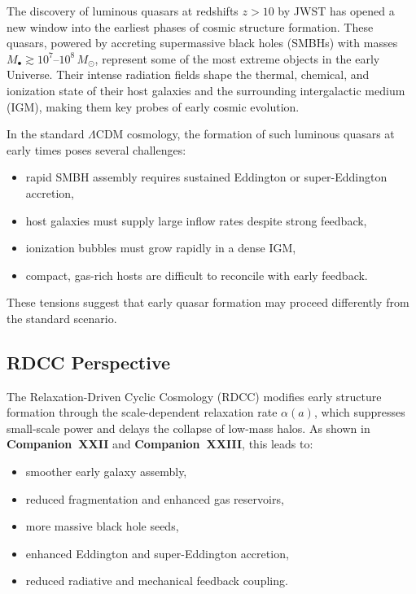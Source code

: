 \documentclass[11pt,a4paper]{article}
\begin{document}
The discovery of luminous quasars at redshifts $z > 10$ by JWST has opened a new window
into the earliest phases of cosmic structure formation. These quasars, powered by accreting
supermassive black holes (SMBHs) with masses $M_{\bullet} \gtrsim 10^{7}$–$10^{8}\,M_{\odot}$,
represent some of the most extreme objects in the early Universe. Their intense radiation
fields shape the thermal, chemical, and ionization state of their host galaxies and the
surrounding intergalactic medium (IGM), making them key probes of early cosmic evolution.

In the standard $\Lambda$CDM cosmology, the formation of such luminous quasars at early
times poses several challenges:
\begin{itemize}
\item rapid SMBH assembly requires sustained Eddington or super-Eddington accretion,
\item host galaxies must supply large inflow rates despite strong feedback,
\item ionization bubbles must grow rapidly in a dense IGM,
\item compact, gas-rich hosts are difficult to reconcile with early feedback.
\end{itemize}

These tensions suggest that early quasar formation may proceed differently from the
standard scenario.

\subsection{RDCC Perspective}

The Relaxation-Driven Cyclic Cosmology (RDCC) modifies early structure formation through
the scale-dependent relaxation rate $\alpha(a)$, which suppresses small-scale power and delays
the collapse of low-mass halos. As shown in \textbf{Companion~XXII} and \textbf{Companion~XXIII},
this leads to:
\begin{itemize}
\item smoother early galaxy assembly,
\item reduced fragmentation and enhanced gas reservoirs,
\item more massive black hole seeds,
\item enhanced Eddington and super-Eddington accretion,
\item reduced radiative and mechanical feedback coupling.
\end{itemize}
\end{document}
